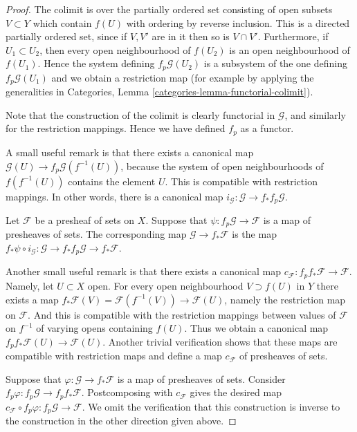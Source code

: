 \begin{proof}
The colimit is over the partially ordered set consisting of open subsets
$V \subset Y$ which contain $f(U)$ with ordering by reverse inclusion.
This is a directed partially ordered set, since if $V, V'$ are in it then
so is $V \cap V'$. Furthermore, if
$U_1 \subset U_2$, then every open neighbourhood of $f(U_2)$
is an open neighbourhood of $f(U_1)$. Hence the system defining
$f_p\mathcal{G}(U_2)$ is a subsystem of the one defining
$f_p\mathcal{G}(U_1)$ and we obtain a restriction map (for
example by applying the generalities in Categories,
Lemma \ref{categories-lemma-functorial-colimit}).

\medskip\noindent
Note that the construction of the colimit is clearly functorial
in $\mathcal{G}$, and similarly for the restriction mappings.
Hence we have defined $f_p$ as a functor.

\medskip\noindent
A small useful remark is that there exists
a canonical map $\mathcal{G}(U) \to f_p\mathcal{G}(f^{-1}(U))$,
because the system of open neighbourhoods
of $f(f^{-1}(U))$ contains the element $U$. This is compatible
with restriction mappings. In other words, there is a
canonical map $i_\mathcal{G} : \mathcal{G} \to f_* f_p \mathcal{G}$.

\medskip\noindent
Let $\mathcal{F}$ be a presheaf of sets on $X$.
Suppose that $\psi : f_p\mathcal{G} \to \mathcal{F}$
is a map of presheaves of sets. The corresponding map
$\mathcal{G} \to f_*\mathcal{F}$ is the map
$f_*\psi \circ i_\mathcal{G} :
\mathcal{G} \to f_* f_p \mathcal{G} \to f_* \mathcal{F}$.

\medskip\noindent
Another small useful remark is that there exists a
canonical map $c_\mathcal{F} : f_p f_* \mathcal{F} \to \mathcal{F}$.
Namely, let $U \subset X$ open.
For every open neighbourhood $V \supset f(U)$ in $Y$
there exists a map
$f_*\mathcal{F}(V) = \mathcal{F}(f^{-1}(V))\to \mathcal{F}(U)$,
namely the restriction map on $\mathcal{F}$. And this is compatible
with the restriction mappings between values of $\mathcal{F}$
on $f^{-1}$ of varying opens containing $f(U)$. Thus we obtain
a canonical map $f_p f_* \mathcal{F}(U) \to \mathcal{F}(U)$.
Another trivial verification shows that these maps are compatible
with restriction maps and define a map $c_\mathcal{F}$
of presheaves of sets.

\medskip\noindent
Suppose that $\varphi : \mathcal{G} \to f_*\mathcal{F}$
is a map of presheaves of sets. Consider $f_p\varphi :
f_p \mathcal{G} \to f_p f_* \mathcal{F}$.
Postcomposing with $c_\mathcal{F}$ gives the desired map
$c_\mathcal{F} \circ f_p\varphi : f_p\mathcal{G} \to \mathcal{F}$.
We omit the verification that this construction is inverse
to the construction in the other direction given above.
\end{proof}

